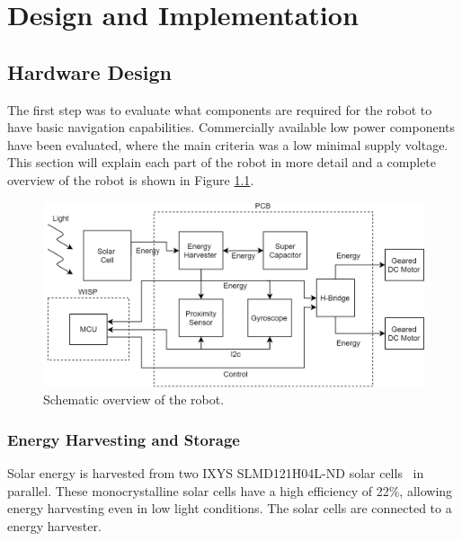 \chapter{Design and Implementation}


\section{Hardware Design}


The first step was to evaluate what components are required for the robot to have basic navigation capabilities.
Commercially available low power components have been evaluated, where the main criteria was a low minimal supply voltage.
This section will explain each part of the robot in more detail and a complete overview of the robot is shown in Figure \ref{fig:robot_overview}.

\vspace{1em}
\begin{figure}[h!]
	\centering
	\includegraphics[width=\textwidth]{pics/schematic_robot_v2.png}
	\caption{Schematic overview of the robot.}
	\label{fig:robot_overview}
\end{figure}

\subsection{Energy Harvesting and Storage}
Solar energy is harvested from two IXYS SLMD121H04L-ND solar cells~\cite{ixolar_slmd121h04l_2017} in parallel.
These monocrystalline solar cells have a high efficiency of 22\%, allowing energy harvesting even in low light conditions.
The solar cells are connected to a energy harvester. 

